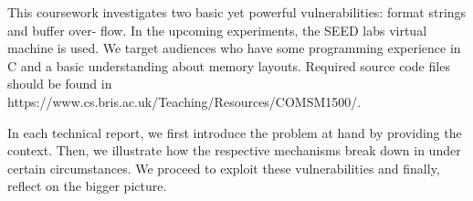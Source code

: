 This coursework investigates two basic yet powerful vulnerabilities: format strings and buffer over- flow. In the upcoming experiments, the SEED labs virtual machine is used. We target audiences who have some programming experience in C and a basic understanding about memory layouts. Required source code files should be found in \\
https://www.cs.bris.ac.uk/Teaching/Resources/COMSM1500/.

In each technical report, we first introduce the problem at hand by providing the context. Then, we illustrate how the respective mechanisms break down in under certain circumstances. We proceed to exploit these vulnerabilities and finally, reflect on the bigger picture.